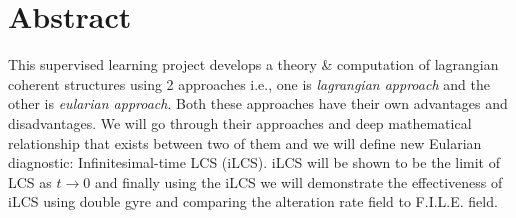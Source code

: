 \documentclass[../report.tex]{subfiles}
\begin{document}
\chapter{Abstract}

This supervised learning project develops a theory \& computation of lagrangian coherent structures using 2 approaches i.e., one is \textit{lagrangian approach} and the other is \textit{eularian approach}. Both these approaches have their own advantages and disadvantages. We will go through their approaches and deep mathematical relationship that exists between two of them and we will define new Eularian diagnostic: Infinitesimal-time LCS (iLCS). iLCS will be shown to be the limit of LCS as \(t \rightarrow 0\) and finally using the iLCS we will demonstrate the effectiveness of iLCS using double gyre and comparing the alteration rate field to F.I.L.E. field.
\end{document}
